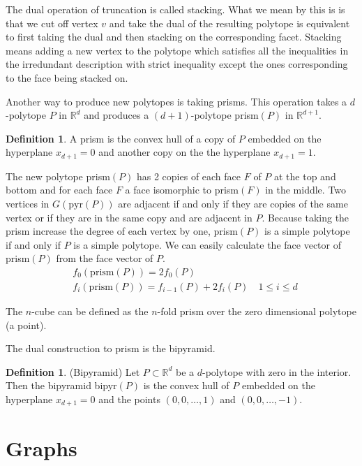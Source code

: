 \documentclass[a4paper,12pt]{book}
\theoremstyle{plain}
\theoremstyle{definition}
\newtheorem{definition}[theorem]{Definition}
\begin{document}
The dual operation of truncation is called stacking. What we mean by this is is that we cut off vertex $v$
and take the dual of the resulting polytope is equivalent to first taking the dual and then stacking on the
corresponding facet.
Stacking means adding a new vertex to the polytope which satisfies all the 
inequalities in the irredundant description with strict inequality except the 
ones corresponding to the face being stacked on.

Another way to produce new polytopes is taking prisms. This operation takes a 
$d$-polytope $P$ in $\mathbb{R}^d$ and produces a $(d+1)$-polytope prism$(P)$ in 
$\mathbb{R}^{d+1}$. 
\begin{definition}
 A prism is the convex hull of a copy of $P$ embedded on the hyperplane 
$x_{d+1} = 0$ and another copy on the the hyperplane $x_{d+1} = 1$.
\end{definition}

 The new polytope prism$(P)$ has 2 copies of 
each face $F$ of $P$ at the top and bottom and for each face $F$ a face isomorphic to 
prism$(F)$ in the middle. Two vertices in $G(\text{pyr}(P))$ are adjacent if and only if
they are copies of the same vertex or if they are in the same copy and are 
adjacent in $P$. Because taking the prism increase the degree of each vertex by one, prism$(P)$ 
is a simple polytope if and only if $P$ is a simple polytope. We can easily calculate
the face vector of prism$(P)$ from the face vector of $P$.
\begin{align}
& f_0(\textrm{prism}(P)) = 2f_0(P) \\
& f_i(\textrm{prism}(P)) = f_{i-1}(P) + 2f_i(P) \quad 1 \le i \le d
\end{align}


The $n$-cube can be defined as the $n$-fold 
prism over the zero dimensional polytope (a point). 

The dual construction to prism 
is the bipyramid. 
\begin{definition}
 (Bipyramid) Let $P\subset \mathbb{R}^d$ be a $d$-polytope with zero in the 
interior. Then the bipyramid bipyr$(P)$ is the convex hull of $P$ embedded on 
the hyperplane $x_{d+1} = 0$ and the points $(0,0,\dots, 1)$ and $(0,0,\dots, 
-1)$.
\end{definition}


\section{Graphs}
\end{document}
